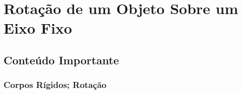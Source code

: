 \section{Rotação de um Objeto Sobre um Eixo Fixo}
\subsection{Conteúdo Importante}
\subsubsection{Corpos Rígidos; Rotação}
